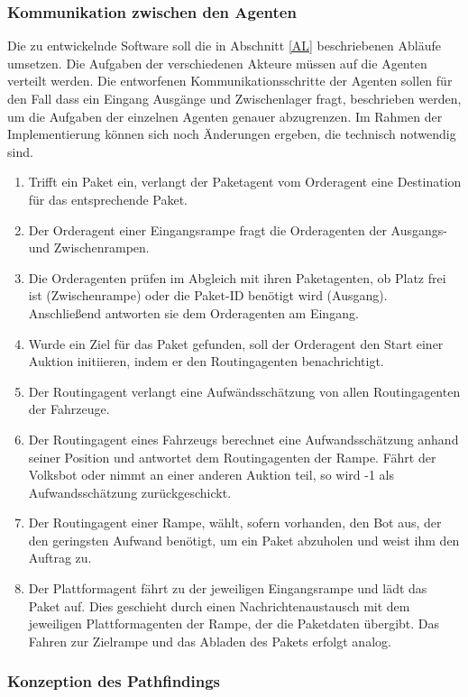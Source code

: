 \subsubsection{Kommunikation zwischen den Agenten}
Die zu entwickelnde Software soll die in Abschnitt \ref{AL} beschriebenen Abläufe umsetzen. Die Aufgaben der verschiedenen Akteure müssen auf die Agenten verteilt werden. Die entworfenen Kommunikationsschritte der Agenten sollen für den Fall dass ein Eingang Ausgänge und Zwischenlager fragt, beschrieben werden, um die Aufgaben der einzelnen Agenten genauer abzugrenzen. Im Rahmen der Implementierung können sich noch Änderungen ergeben, die technisch notwendig sind. 
\begin{enumerate}
\item Trifft ein Paket ein, verlangt der Paketagent vom Orderagent eine Destination für das entsprechende Paket.
\item Der Orderagent einer Eingangsrampe fragt die Orderagenten der Ausgangs- und Zwischenrampen.
\item Die Orderagenten prüfen im Abgleich mit ihren Paketagenten, ob Platz frei ist (Zwischenrampe) oder die Paket-ID benötigt wird (Ausgang). Anschließend antworten sie dem Orderagenten am Eingang.  
\item Wurde ein Ziel für das Paket gefunden, soll der Orderagent den Start einer Auktion initiieren, indem er den Routingagenten benachrichtigt. 
\item Der Routingagent verlangt eine Aufwändsschätzung von allen Routingagenten der Fahrzeuge.
\item Der Routingagent eines Fahrzeugs berechnet eine Aufwandsschätzung anhand seiner Position und antwortet dem Routingagenten der Rampe. Fährt der Volksbot oder nimmt an einer anderen Auktion teil, so wird -1 als Aufwandsschätzung zurückgeschickt.
\item Der Routingagent einer Rampe, wählt, sofern vorhanden, den Bot aus, der den geringsten Aufwand benötigt, um ein Paket abzuholen und weist ihm den Auftrag zu.
\item Der Plattformagent fährt zu der jeweiligen Eingangsrampe und lädt das Paket auf. Dies geschieht durch einen Nachrichtenaustausch mit dem jeweiligen Plattformagenten der Rampe, der die Paketdaten übergibt. Das Fahren zur Zielrampe und das Abladen des Pakets erfolgt analog. 
\end{enumerate}
\subsubsection{Konzeption des Pathfindings}
